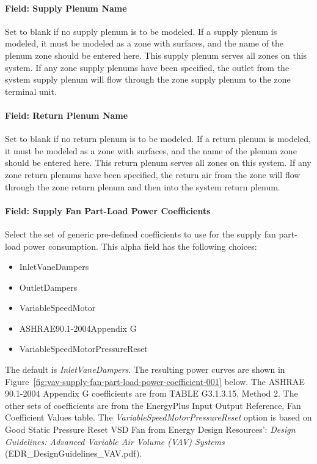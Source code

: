 \paragraph{Field: Supply Plenum Name}\label{field-supply-plenum-name-9}

Set to blank if no supply plenum is to be modeled. If a supply plenum is modeled, it must be modeled as a zone with surfaces, and the name of the plenum zone should be entered here. This supply plenum serves all zones on this system. If any zone supply plenums have been specified, the outlet from the system supply plenum will flow through the zone supply plenum to the zone terminal unit.

\paragraph{Field: Return Plenum Name}\label{field-return-plenum-name-10}

Set to blank if no return plenum is to be modeled. If a return plenum is modeled, it must be modeled as a zone with surfaces, and the name of the plenum zone should be entered here. This return plenum serves all zones on this system. If any zone return plenums have been specified, the return air from the zone will flow through the zone return plenum and then into the system return plenum.

\paragraph{Field: Supply Fan Part-Load Power Coefficients}\label{field-supply-fan-part-load-power-coefficients-1}

Select the set of generic pre-defined coefficients to use for the supply fan part-load power consumption. This alpha field has the following choices:

\begin{itemize}
\item
  InletVaneDampers
\item
  OutletDampers
\item
  VariableSpeedMotor
\item
  ASHRAE90.1-2004Appendix G
\item
  VariableSpeedMotorPressureReset
\end{itemize}

The default is \emph{InletVaneDampers}. The resulting power curves are shown in Figure~\ref{fig:vav-supply-fan-part-load-power-coefficient-001} below. The ASHRAE 90.1-2004 Appendix G coefficients are from TABLE G3.1.3.15, Method 2. The other sets of coefficients are from the EnergyPlus Input Output Reference, Fan Coefficient Values table. The \emph{VariableSpeedMotorPressureReset} option is based on Good Static Pressure Reset VSD Fan from Energy Design Resources': \emph{Design Guidelines: Advanced Variable Air Volume (VAV) Systems} (EDR\_DesignGuidelines\_VAV.pdf).


